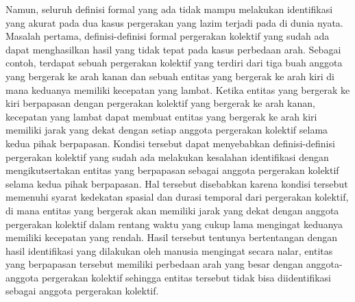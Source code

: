 Namun, seluruh definisi formal yang ada tidak mampu melakukan identifikasi yang akurat pada dua kasus pergerakan yang lazim terjadi pada di dunia nyata. Masalah pertama, definisi-definisi formal pergerakan kolektif yang sudah ada dapat menghasilkan hasil yang tidak tepat pada kasus perbedaan arah. Sebagai contoh, terdapat sebuah pergerakan kolektif yang terdiri dari tiga buah anggota yang bergerak ke arah kanan dan sebuah entitas yang bergerak ke arah kiri di mana keduanya memiliki kecepatan yang lambat. Ketika entitas yang bergerak ke kiri berpapasan dengan pergerakan kolektif yang bergerak ke arah kanan, kecepatan yang lambat dapat membuat entitas yang bergerak ke arah kiri memiliki jarak yang dekat dengan setiap anggota pergerakan kolektif selama kedua pihak berpapasan. Kondisi tersebut dapat menyebabkan definisi-definisi pergerakan kolektif yang sudah ada melakukan kesalahan identifikasi dengan mengikutsertakan entitas yang berpapasan sebagai anggota pergerakan kolektif selama kedua pihak berpapasan. Hal tersebut disebabkan karena kondisi tersebut memenuhi syarat kedekatan spasial dan durasi temporal dari pergerakan kolektif, di mana entitas yang bergerak akan memiliki jarak yang dekat dengan anggota pergerakan kolektif dalam rentang waktu yang cukup lama mengingat keduanya memiliki kecepatan yang rendah. Hasil tersebut tentunya bertentangan dengan hasil identifikasi yang dilakukan oleh manusia mengingat secara nalar, entitas yang berpapasan tersebut memiliki perbedaan arah yang besar dengan anggota-anggota pergerakan kolektif sehingga entitas tersebut tidak bisa diidentifikasi sebagai anggota pergerakan kolektif.

